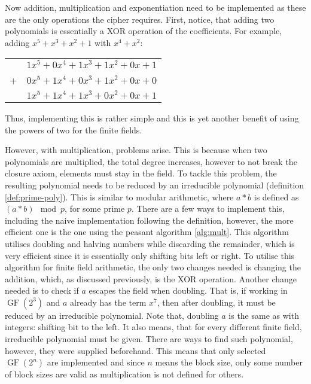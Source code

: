 \documentclass{Resources/UoBLab1}
\theoremstyle{definition}
\begin{document}
Now addition, multiplication and exponentiation need to be implemented as these are the only operations the cipher requires. First, notice, that adding two polynomials is essentially a XOR operation of the coefficients. For example, adding $x^5 + x^3 + x^2 + 1$ with $x^4 + x^2$:
\begin{table}[h]
    \centering
    \begin{tabular}{l r}
        & $1x^5 + 0x^4 + 1x^3 + 1x^2 + 0x + 1$ \\
        +& $0x^5 + 1x^4 + 0x^3 + 1x^2 + 0x + 0$ \\
        \hline
        & $1x^5 + 1x^4 + 1x^3 + 0x^2 + 0x + 1$
    \end{tabular}
\end{table}

Thus, implementing this is rather simple and this is yet another benefit of using the powers of two for the finite fields.

However, with multiplication, problems arise. This is because when two polynomials are multiplied, the total degree increases, however to not break the closure axiom, elements must stay in the field. To tackle this problem, the resulting polynomial needs to be reduced by an irreducible polynomial (definition \ref{def:prime-poly}). This is similar to modular arithmetic, where $a * b$ is defined as $(a * b) \mod p$, for some prime $p$. There are a few ways to implement this, including the naive implementation following the definition, however, the more efficient one is the one using the peasant algorithm \ref{alg:mult}. This algorithm utilises doubling and halving numbers while discarding the remainder, which is very efficient since it is essentially only shifting bits left or right. To utilise this algorithm for finite field arithmetic, the only two changes needed is changing the addition, which, as discussed previously, is the XOR operation. Another change needed is to check if $a$ escapes the field when doubling. That is, if working in $\operatorname{GF}(2^3)$ and $a$ already has the term $x^7$, then after doubling, it must be reduced by an irreducible polynomial. Note that, doubling $a$ is the same as with integers: shifting bit to the left. It also means, that for every different finite field, irreducible polynomial must be given. There are ways to find such polynomial, however, they were supplied beforehand. This means that only selected $\operatorname{GF}(2^n)$ are implemented and since $n$ means the block size, only some number of block sizes are valid as multiplication is not defined for others.
\end{document}
